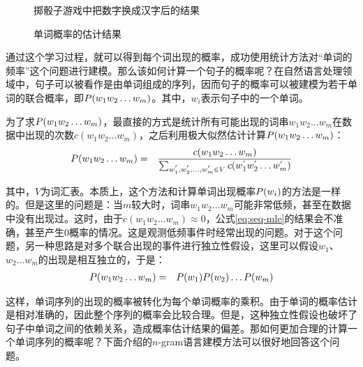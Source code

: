 \begin{figure}[htp]
\centering

\setlength{\belowcaptionskip}{-0.2cm}
\caption{掷骰子游戏中把数字换成汉字后的结果}
\label{fig:2-8}
\end{figure}

\begin{figure}[htp]
\centering

\caption{单词概率的估计结果}
\label{fig:2-9}
\end{figure}

\parinterval 通过这个学习过程，就可以得到每个词出现的概率，成功使用统计方法对“单词的频率”这个问题进行建模。那么该如何计算一个句子的概率呢？在自然语言处理领域中，句子可以被看作是由单词组成的序列，因而句子的概率可以被建模为若干单词的联合概率，即${P}(w_1 w_2 \ldots w_m)$。其中，$w_i$表示句子中的一个单词。

\parinterval 为了求${P}(w_1 w_2 \ldots w_m)$，最直接的方式是统计所有可能出现的词串$w_1 w_2 \ldots w_m$在数据中出现的次数$c(w_1 w_2 \ldots w_m)$，之后利用极大似然估计计算${P}(w_1 w_2 \ldots w_m)$：
\begin{eqnarray}
{P}(w_1 w_2 \ldots w_m) & = & \frac{c(w_1 w_2 \ldots w_m)}{\sum_{w^{'}_1, w^{'}_2,...,w^{'}_m \in V} c(w^{'}_1 w^{'}_2 \ldots w^{'}_m)} \label{eq:seq-mle}
\label{eq:2-20}
\end{eqnarray}

\noindent 其中，$V$为词汇表。本质上，这个方法和计算单词出现概率${P}(w_i)$的方法是一样的。但是这里的问题是：当$m$较大时，词串$w_1 w_2 \ldots w_m$可能非常低频，甚至在数据中没有出现过。这时，由于$c(w_1 w_2 \ldots w_m) \approx 0$，公式\eqref{eq:seq-mle}的结果会不准确，甚至产生0概率的情况。这是观测低频事件时经常出现的问题。对于这个问题，另一种思路是对多个联合出现的事件进行独立性假设，这里可以假设$w_1$、$w_2\ldots w_m$的出现是相互独立的，于是：
\begin{eqnarray}
{P}(w_1 w_2 \ldots w_m) & = & {P}(w_1) {P}(w_2) \ldots {P}(w_m) \label{eq:seq-independ}
\label{eq:2-21}
\end{eqnarray}

\noindent 这样，单词序列的出现的概率被转化为每个单词概率的乘积。由于单词的概率估计是相对准确的，因此整个序列的概率会比较合理。但是，这种独立性假设也破坏了句子中单词之间的依赖关系，造成概率估计结果的偏差。那如何更加合理的计算一个单词序列的概率呢？下面介绍的$n$-gram语言建模方法可以很好地回答这个问题。

